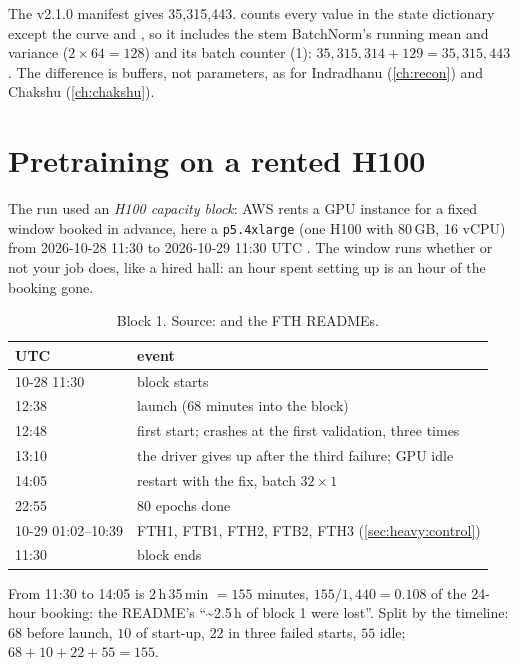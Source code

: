 \begin{sourcenote}
The v2.1.0 manifest gives  35,315,443.  counts every value in the
state dictionary except the  curve and , so it includes the stem BatchNorm's running mean
and variance ($2\times64=128$) and its batch counter (1): $35{,}315{,}314+129=35{,}315{,}443$. The difference is buffers,
not parameters, as for Indradhanu (\cref{ch:recon}) and Chakshu (\cref{ch:chakshu}).
\end{sourcenote}

\section{Pretraining on a rented H100}\label{sec:heavy:pretrain}

The run used an \emph{H100 capacity block}: AWS rents a GPU instance for a fixed window
booked in advance, here a \texttt{p5.4xlarge} (one H100 with 80\,GB, 16 vCPU) from 2026-10-28 11:30 to 2026-10-29
11:30 UTC . The window runs whether or not your job does, like a hired hall: an hour
spent setting up is an hour of the booking gone.

\begin{table}[htbp]
\centering\small
\begin{tabular}{ll}
\toprule
UTC & event\\
\midrule
10-28 11:30 & block starts\\
12:38 & launch (68 minutes into the block)\\
12:48 & first start; crashes at the first validation, three times\\
13:10 & the driver gives up after the third failure; GPU idle\\
14:05 & restart with the fix, batch $32\times1$\\
22:55 & 80 epochs done\\
10-29 01:02--10:39 & FTH1, FTB1, FTH2, FTB2, FTH3 (\cref{sec:heavy:control})\\
11:30 & block ends\\
\bottomrule
\end{tabular}
\caption{Block 1. Source:  and the FTH READMEs.}
\label{tab:heavy:timeline}
\end{table}

From 11:30 to 14:05 is 2\,h\,35\,min $=155$ minutes, $155/1{,}440=0.108$ of the 24-hour booking: the README's
``\textasciitilde2.5\,h of block 1 were lost''. Split by the timeline: $68$ before launch, $10$ of start-up, $22$
in three failed starts, $55$ idle; $68+10+22+55=155$.

